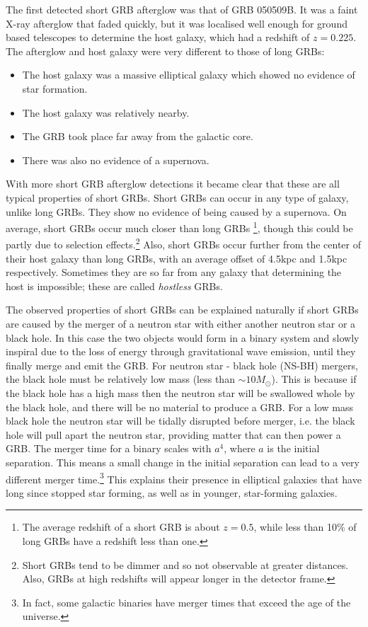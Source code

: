 \documentclass[11pt]{cuthesis}
\begin{document}
The first detected short GRB afterglow was that of GRB 050509B. It was a faint X-ray afterglow that faded quickly, but it was localised well enough for ground based telescopes to determine the host galaxy, which had a redshift of $z=0.225$. The afterglow and host galaxy were very different to those of long GRBs:
\begin{itemize}
\item The host galaxy was a massive elliptical galaxy which showed no evidence of star formation.
\item The host galaxy was relatively nearby.
\item The GRB took place far away from the galactic core.
\item There was also no evidence of a supernova.
\end{itemize} 
With more short GRB afterglow detections it became clear that these are all typical properties of short GRBs. Short GRBs can occur in any type of galaxy, unlike long GRBs. They show no evidence of being caused by a supernova. On average, short GRBs occur much closer than long GRBs \footnote{The average redshift of a short GRB is about $z=0.5$, while less than 10\% of long GRBs have a redshift less than one.\cite{Le:2017jua}}, though this could be partly due to selection effects.\footnote{Short GRBs tend to be dimmer and so not observable at greater distances. Also, GRBs at  high redshifts will appear longer in the detector frame.}  Also, short GRBs occur further from the center of their host galaxy than long GRBs, with an average offset of 4.5kpc and 1.5kpc respectively. Sometimes they are so far from any galaxy that determining the host is impossible; these are called \textit{hostless} GRBs.

The observed properties of short GRBs can be explained naturally if short GRBs are caused by the merger of a neutron star with either another neutron star or a black hole. In this case the two objects would form in a binary system and slowly inspiral due to the loss of energy through gravitational wave emission, until they finally merge and emit the GRB. For neutron star - black hole (NS-BH) mergers, the black hole must be relatively low mass (less than $\sim 10M_\odot$)\cite{gw_grb_paradigm}. This is because if the black hole has a high mass then the neutron star will be swallowed whole by the black hole, and there will be no material to produce a GRB. For a low mass black hole the neutron star will be tidally disrupted before merger, i.e. the black hole will pull apart the neutron star, providing matter that can then power a GRB. The merger time for a binary scales with $a^4$, where $a$ is the initial separation. This means a small change in the initial separation can lead to a very different merger time.\footnote{In fact, some galactic binaries have merger times that exceed the age of the universe.} This explains their presence in elliptical galaxies that have long since stopped star forming, as well as in younger, star-forming galaxies. 
\end{document}
